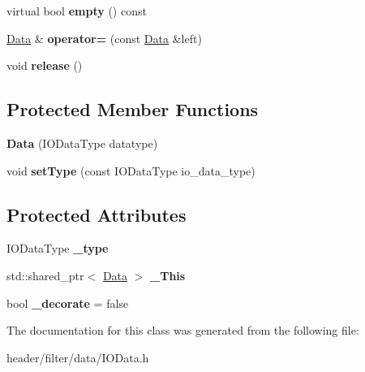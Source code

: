 \begin{DoxyCompactItemize}
\mbox{\label{classfilter_1_1data_1_1_data_ac974955f3c516f66cbc2881e07ad5f15}} 
virtual bool {\bfseries empty} () const
\item 
\mbox{\label{classfilter_1_1data_1_1_data_a3b51e933a2eefdda21d5e03fe9745c95}} 
\hyperlink{classfilter_1_1data_1_1_data}{Data} \& {\bfseries operator=} (const \hyperlink{classfilter_1_1data_1_1_data}{Data} \&left)
\item 
\mbox{\label{classfilter_1_1data_1_1_data_aaabb3dcd8311c387a445dff74e690909}} 
void {\bfseries release} ()
\end{DoxyCompactItemize}
\subsection*{Protected Member Functions}
\begin{DoxyCompactItemize}
\item 
\mbox{\label{classfilter_1_1data_1_1_data_a1e19fabae8ee601353c40b799e2ce190}} 
{\bfseries Data} (I\+O\+Data\+Type datatype)
\item 
\mbox{\label{classfilter_1_1data_1_1_data_a770c9fef477e8cc75b71238a817aa0f9}} 
void {\bfseries set\+Type} (const I\+O\+Data\+Type io\+\_\+data\+\_\+type)
\end{DoxyCompactItemize}
\subsection*{Protected Attributes}
\begin{DoxyCompactItemize}
\item 
\mbox{\label{classfilter_1_1data_1_1_data_aefb406c780862d52d3737baccc2637a8}} 
I\+O\+Data\+Type {\bfseries \+\_\+type}
\item 
\mbox{\label{classfilter_1_1data_1_1_data_a102327be7d0e7a08923a2d8a9a908407}} 
std\+::shared\+\_\+ptr$<$ \hyperlink{classfilter_1_1data_1_1_data}{Data} $>$ {\bfseries \+\_\+\+This}
\item 
\mbox{\label{classfilter_1_1data_1_1_data_af0923570708eec4f8c7e3c86c49a7ef9}} 
bool {\bfseries \+\_\+decorate} = false
\end{DoxyCompactItemize}


The documentation for this class was generated from the following file\+:\begin{DoxyCompactItemize}
\item 
header/filter/data/I\+O\+Data.\+h\end{DoxyCompactItemize}
